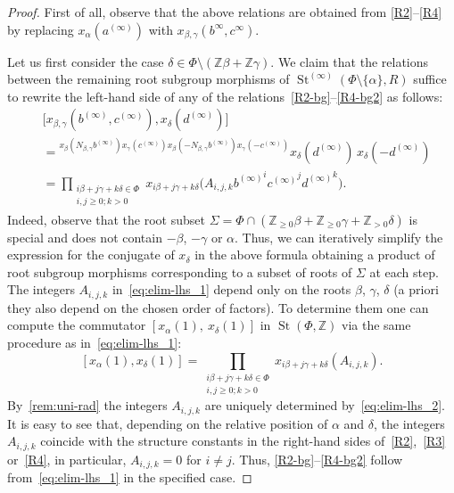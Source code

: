 \documentclass[oneside, 11pt]{amsart}
\numberwithin{equation}{section}
\theoremstyle{definition}
\theoremstyle{remark}
\DeclareMathOperator\St{St}
\newcommand{\ZZ}{\mathbb{Z}}
\newcommand{\up}[2]{{^{#1}\!{#2}}}
\begin{document}
\begin{proof}
 First of all, observe that the above relations are obtained from \eqref{R2}--\eqref{R4} by replacing $x_\alpha(a^{(\infty)})$ with $x_{\beta, \gamma}(b^{\infty}, c^{\infty})$.
 
 Let us first consider the case \(\delta \in \Phi \setminus (\ZZ \beta + \ZZ \gamma)\).
 We claim that the relations between the remaining root subgroup morphisms of $\St^{(\infty)}(\Phi\setminus\{\alpha\}, R)$ suffice to rewrite the left-hand side of any of the relations~\eqref{R2-bg}--\eqref{R4-bg2} as follows:
 \begin{align}
  &\bigl[x_{\beta, \gamma}(b^{(\infty)}, c^{(\infty)}), x_\delta(d^{(\infty)})\bigr] \nonumber \\
  &= \up{x_\beta(N_{\beta, \gamma} b^{(\infty)})
   x_\gamma(c^{(\infty)})
   x_\beta(-N_{\beta, \gamma} b^{(\infty)})
   x_\gamma(-c^{(\infty)})}
  {x_\delta(d^{(\infty)})}\,
  x_\delta(-d^{(\infty)}) \label{eq:elim-lhs_1} \\
  &= \prod_{\substack{i\beta + j\gamma + k\delta \in \Phi\\ i, j \geq 0; k > 0}}
  x_{i\beta + j\gamma + k\delta} \bigl(A_{i, j, k} {b^{(\infty)}}^i {c^{(\infty)}}^j {d^{(\infty)}}^k\bigr). \nonumber
 \end{align}
 Indeed, observe that the root subset $\Sigma = \Phi \cap (\ZZ_{\geq 0}\beta + \ZZ_{\geq 0}\gamma + \ZZ_{> 0}\delta)$ is special and does not contain $-\beta$, $-\gamma$ or $\alpha$. Thus, we can iteratively simplify the expression for the conjugate of $x_\delta$ in the above formula obtaining a product of root subgroup morphisms corresponding to a subset of roots of $\Sigma$ at each step.
 The integers \(A_{i, j, k}\) in~\eqref{eq:elim-lhs_1} depend only on the roots \(\beta\), \(\gamma\), \(\delta\) (a priori they also depend on the chosen order of factors). To determine them one can compute the commutator $[x_\alpha(1),\ x_\delta(1)]$ in $\St(\Phi, \ZZ)$ via the same procedure as in~\eqref{eq:elim-lhs_1}:
 \begin{equation} \label{eq:elim-lhs_2}
  [x_\alpha(1), x_\delta(1)] = \prod_{\substack{i\beta + j\gamma + k\delta \in \Phi\\ i, j \geq 0; k > 0}}
  x_{i\beta + j\gamma + k\delta}(A_{i, j, k}).
 \end{equation}
  By~\cref{rem:uni-rad} the integers $A_{i,j,k}$ are uniquely determined by~\eqref{eq:elim-lhs_2}.
  It is easy to see that, depending on the relative position of $\alpha$ and $\delta$, the integers $A_{i,j,k}$ coincide with the structure constants in the right-hand sides of~\eqref{R2},~\eqref{R3} or~\eqref{R4}, in particular, $A_{i,j,k}=0$ for $i\neq j$.
  Thus, \eqref{R2-bg}--\eqref{R4-bg2} follow from~\eqref{eq:elim-lhs_1} in the specified case.
 

\end{proof}
\end{document}
